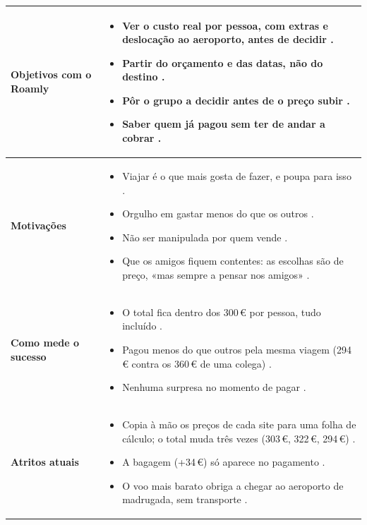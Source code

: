 \begin{table}[H]
\centering\small
\begin{tabularx}{\textwidth}{@{}p{3.2cm}L@{}}
\toprule
\textbf{Objetivos com o Roamly} &
\begin{itemize}[topsep=0pt]
  \item Ver o \textbf{custo real por pessoa}, com extras e deslocação ao aeroporto, antes de decidir .
  \item Partir do \textbf{orçamento e das datas}, não do destino .
  \item Pôr o grupo a decidir \textbf{antes de o preço subir} .
  \item Saber quem já pagou sem ter de andar a cobrar .
\end{itemize} \\
\midrule
\textbf{Motivações} &
\begin{itemize}[topsep=0pt]
  \item Viajar é o que mais gosta de fazer, e poupa para isso .
  \item Orgulho em gastar menos do que os outros .
  \item Não ser manipulada por quem vende .
  \item Que os amigos fiquem contentes: as escolhas são de preço, «mas sempre a pensar nos amigos» .
\end{itemize} \\
\midrule
\textbf{Como mede o sucesso} &
\begin{itemize}[topsep=0pt]
  \item O total fica dentro dos 300\,€ por pessoa, tudo incluído .
  \item Pagou menos do que outros pela mesma viagem (294\,€ contra os 360\,€ de uma colega) .
  \item Nenhuma surpresa no momento de pagar .
\end{itemize} \\
\midrule
\textbf{Atritos atuais} &
\begin{itemize}[topsep=0pt]
  \item Copia à mão os preços de cada site para uma folha de cálculo; o total muda três vezes (303\,€, 322\,€, 294\,€) .
  \item A bagagem (+34\,€) só aparece no pagamento .
  \item O voo mais barato obriga a chegar ao aeroporto de madrugada, sem transporte .

\end{itemize}
\end{tabularx}
\end{table}
